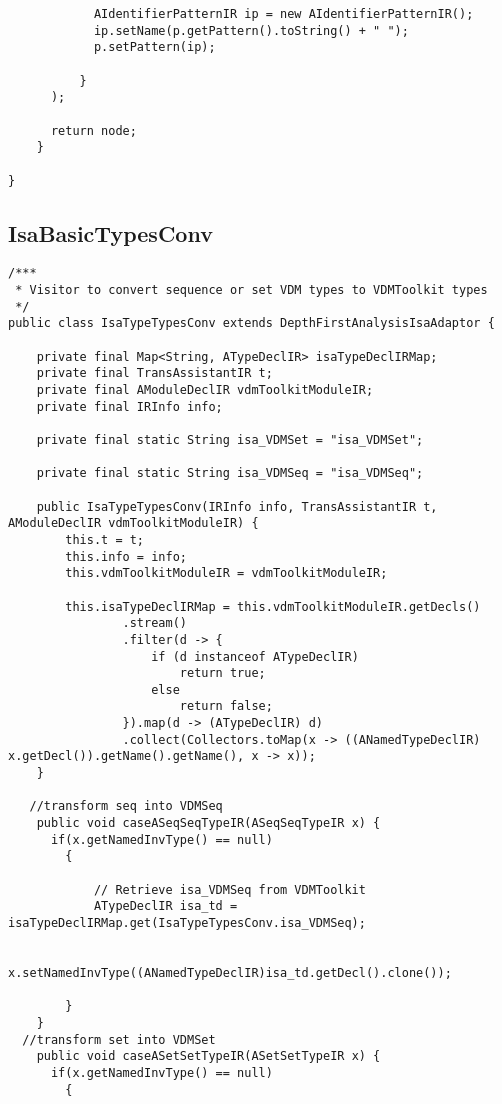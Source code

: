 \begin{appendices}
\begin{lstlisting}
            AIdentifierPatternIR ip = new AIdentifierPatternIR();
            ip.setName(p.getPattern().toString() + " ");
            p.setPattern(ip);
            
          }
      );
      
      return node;
    }
    
}
\end{lstlisting}

\subsection{IsaBasicTypesConv} \label{IsaBasicTypesConvafter}
\begin{lstlisting}
/***
 * Visitor to convert sequence or set VDM types to VDMToolkit types
 */
public class IsaTypeTypesConv extends DepthFirstAnalysisIsaAdaptor {

    private final Map<String, ATypeDeclIR> isaTypeDeclIRMap;
    private final TransAssistantIR t;
    private final AModuleDeclIR vdmToolkitModuleIR;
    private final IRInfo info;

    private final static String isa_VDMSet = "isa_VDMSet";

    private final static String isa_VDMSeq = "isa_VDMSeq";

    public IsaTypeTypesConv(IRInfo info, TransAssistantIR t, AModuleDeclIR vdmToolkitModuleIR) {
        this.t = t;
        this.info = info;
        this.vdmToolkitModuleIR = vdmToolkitModuleIR;

        this.isaTypeDeclIRMap = this.vdmToolkitModuleIR.getDecls()
                .stream()
                .filter(d -> {
                    if (d instanceof ATypeDeclIR)
                        return true;
                    else
                        return false;
                }).map(d -> (ATypeDeclIR) d)
                .collect(Collectors.toMap(x -> ((ANamedTypeDeclIR) x.getDecl()).getName().getName(), x -> x));
    }
    
   //transform seq into VDMSeq
    public void caseASeqSeqTypeIR(ASeqSeqTypeIR x) {
      if(x.getNamedInvType() == null)
        {
            
            // Retrieve isa_VDMSeq from VDMToolkit
            ATypeDeclIR isa_td = isaTypeDeclIRMap.get(IsaTypeTypesConv.isa_VDMSeq);

            x.setNamedInvType((ANamedTypeDeclIR)isa_td.getDecl().clone());
            
        }
    }
  //transform set into VDMSet
    public void caseASetSetTypeIR(ASetSetTypeIR x) {
      if(x.getNamedInvType() == null)
        {
            

\end{lstlisting}
\end{appendices}
